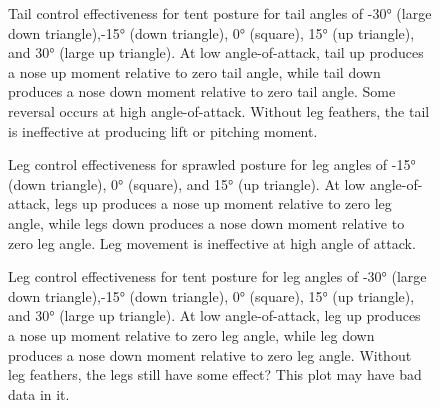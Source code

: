 \begin{figure}
\caption{Tail control effectiveness for tent posture for tail angles of \ang{-30} (large down triangle),\ang{-15} (down triangle), \ang{0} (square), \ang{+15} (up triangle), and \ang{+30} (large up triangle).  At low angle-of-attack, tail up produces a nose up moment relative to zero tail angle, while tail down produces a nose down moment relative to zero tail angle.  Some reversal occurs at high angle-of-attack.  Without leg feathers, the tail is ineffective at producing lift or pitching moment.}
\end{figure}
\begin{figure}
\caption{Leg control effectiveness for sprawled posture for leg angles of \ang{-15} (down triangle), \ang{0} (square), and \ang{+15} (up triangle).  At low angle-of-attack, legs up produces a nose up moment relative to zero leg angle, while legs down produces a nose down moment relative to zero leg angle. Leg movement is ineffective at high angle of attack.}
\end{figure}
\begin{figure}
\caption{Leg control effectiveness for tent posture for leg angles of \ang{-30} (large down triangle),\ang{-15} (down triangle), \ang{0} (square), \ang{+15} (up triangle), and \ang{+30} (large up triangle).  At low angle-of-attack, leg up produces a nose up moment relative to zero leg angle, while leg down produces a nose down moment relative to zero leg angle. Without leg feathers, the legs still have some effect?  This plot may have bad data in it.}
\end{figure}
